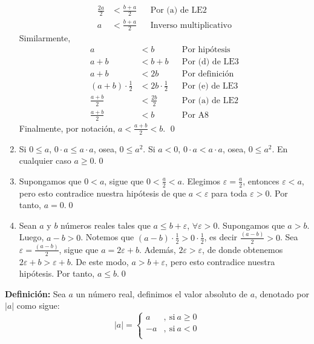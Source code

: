 \documentclass[11pt]{article}
\begin{document}
\begin{enumerate}[label=\alph*)]
\begin{align*}
        \frac{2a}{2} &< \frac{b+a}{2} && \text{Por (a) de LE2} \\
        a &< \frac{b+a}{2} && \text{Inverso multiplicativo}
    \end{align*} Similarmente,
    \begin{align*}
        a &< b && \text{Por hipótesis} \\
        a + b &< b+b && \text{Por (d) de LE3} \\
        a +b &< 2b && \text{Por definición} \\
        (a+b) \cdot \frac{1}{2} &< 2b \cdot \frac{1}{2} && \text{Por (e) de LE3} \\
        \frac{a+b}{2} &< \frac{2b}{2} && \text{Por (a) de LE2} \\
        \frac{a+b}{2} &< b && \text{Por A8}
    \end{align*} Finalmente, por notación, $a < \frac{a+b}{2} < b$. \qed

    \item Si $0 \leq a$, $ 0\cdot a \leq a \cdot a$, osea, $0 \leq a^2$. Si $a<0$, $0\cdot a < a \cdot a$, osea, $0 \leq a^2$. En cualquier caso $a\geq0$.\qed
    \item Supongamos que $0<a$, sigue que $0<\frac{a}{2}<a$. Elegimos $\varepsilon=\frac{a}{2}$, entonces $\varepsilon<a$, pero esto contradice nuestra hipótesis de que $a< \varepsilon$ para toda $\varepsilon>0$. Por tanto, $a=0$.\qed
    \item Sean $a$ y $b$ números reales tales que $a \leq b + \varepsilon$, $\forall \varepsilon > 0$. Supongamos que $a > b$. Luego, $a-b>0$. Notemos que $(a-b) \cdot \frac{1}{2} > 0 \cdot \frac{1}{2}$, es decir $\frac{(a-b)}{2} > 0$. Sea $\varepsilon = \frac{(a-b)}{2}$, sigue que $a=2\varepsilon+b$. Además, $2\varepsilon > \varepsilon$, de donde obtenemos $2 \varepsilon + b > \varepsilon + b$. De este modo, $a > b+\varepsilon$, pero esto contradice nuestra hipótesis. Por tanto, $a \leq b$.\qed

\end{enumerate}

\textbf{Definición:} Sea $a$ un número real, definimos el valor absoluto de $a$, denotado por $|a|$ como sigue: 
    \[
    |a| = 
    \left \{
        \begin{aligned}
        a &,\ \text{si} \ a \geq 0\\
        -a &,\ \text{si} \ a < 0 \\
        \end{aligned}
    \right .
    \]
\end{document}

